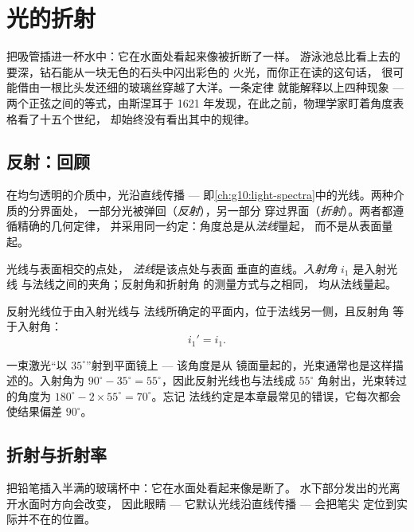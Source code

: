 \chapter{光的折射}\label{ch:g10:refraction}

把吸管插进一杯水中：它在水面处看起来像被折断了一样。
游泳池总比看上去的要深，钻石能从一块无色的石头中闪出彩色的
火光，而你正在读的这句话，
很可能借由一根比头发还细的玻璃丝穿越了大洋。一条定律
就能解释以上四种现象 --- 两个正弦之间的等式，由斯涅耳于
1621 年发现，在此之前，物理学家盯着角度表格看了十五个世纪，
却始终没有看出其中的规律。

\section{反射：回顾}

在均匀透明的介质中，光沿直线传播 ---
即\cref{ch:g10:light-spectra}中的光线。两种介质的分界面处，
一部分光被弹回（\emph{反射}），另一部分
穿过界面（\emph{折射}）。两者都遵循精确的几何定律，
并采用同一约定：角度总是从\emph{法线}量起，
而不是从表面量起。

\begin{definition}[法线与入射角]\label{def:g10:refraction:angles}
光线与表面相交的点处，
\emph{法线}是该点处与表面
垂直的直线。\emph{入射角} $i_1$ 是入射光线
与法线之间的夹角；反射角和折射角
的测量方式与之相同，
均从法线量起。
\end{definition}

\begin{proposition}[反射定律]\label{prop:g10:refraction:reflection}
反射光线位于由入射光线与
法线所确定的平面内，位于法线另一侧，且反射角
等于入射角：
\[
i_1' = i_1 .
\]
\end{proposition}
\admitted

\begin{example}[正确读取角度]\label{ex:g10:refraction:mirror}
一束激光“以 $35^\circ$”射到平面镜上 --- 该角度是从
镜面量起的，光束通常也是这样描述的。入射角为
$90^\circ - 35^\circ = 55^\circ$，因此反射光线也与法线成
$55^\circ$ 角射出，光束转过的角度为
$180^\circ - 2 \times 55^\circ = 70^\circ$。忘记
法线约定是本章最常见的错误，它每次都会
使结果偏差 $90^\circ$。
\end{example}

\section{折射与折射率}

把铅笔插入半满的玻璃杯中：它在水面处看起来像是断了。
水下部分发出的光离开水面时方向会改变，
因此眼睛 --- 它默认光线沿直线传播 --- 会把笔尖
定位到实际并不在的位置。

